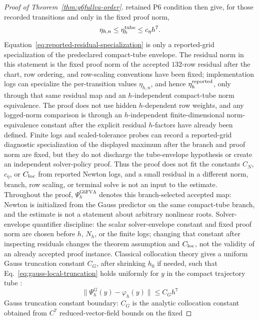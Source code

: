 \documentclass[preprint,12pt]{elsarticle}
\begin{document}
\begin{proof}[Proof of Theorem~\ref{thm:g6fullva-order}]
retained P6 condition then give, for those recorded transitions and only in
the fixed proof norm,
\begin{equation}
\label{eq:reported-residual-specialization}
  \eta_{h,n}\le \eta_h^{\rm tube}\le c_\eta h^7 .
\end{equation}
Equation~\eqref{eq:reported-residual-specialization} is only a reported-grid
specialization of the predeclared compact-tube envelope.
The residual norm in this statement is the fixed proof norm of the accepted
\(132\)-row residual after the chart, row ordering, and row-scaling
conventions have been fixed; implementation logs can specialize the
per-transition values \(\eta_{h,n}\), and hence
\(\eta_h^{\rm reported}\), only through that same residual map and an
\(h\)-independent compact-tube norm equivalence. The proof does not use
hidden \(h\)-dependent row weights, and
any logged-norm comparison is through an \(h\)-independent
finite-dimensional norm-equivalence constant after the explicit residual
\(h\)-factors have already been defined. Finite logs and scaled-tolerance
probes can record a reported-grid diagnostic specialization of the displayed
maximum after the branch and proof norm are fixed, but they do not discharge
the tube-envelope hypothesis or create an independent solver-policy proof. Thus
the proof does not fit the constants \(C_N\), \(c_\eta\), or \(C_{\rm loc}\)
from reported Newton logs, and a small residual in a different norm, branch,
row scaling, or terminal solve is not an input to the estimate. Throughout
the proof, \(\Psi_h^{\mathrm{G6FVA}}\) denotes this branch-selected accepted map:
Newton is initialized from the Gauss predictor on the same compact-tube
branch, and the estimate is not a statement about arbitrary nonlinear roots.
Solver-envelope quantifier discipline: the scalar solver-envelope constant and fixed
proof norm are chosen before \(h\), \(N_h\), or the finite logs; changing that
constant after inspecting residuals changes the theorem assumption and
\(C_{\rm loc}\), not the validity of an already accepted proof instance.
Classical collocation theory gives a
uniform Gauss truncation constant \(C_G\), after shrinking \(h_0\) if needed,
such that Eq.~\eqref{eq:gauss-local-truncation} holds uniformly for \(y\) in
the compact trajectory tube \cite{hairer1993solving}:
\begin{equation}
\label{eq:gauss-local-truncation}
  \|\Psi_h^G(y)-\varphi_h(y)\|\le C_Gh^7
\end{equation}
Gauss truncation constant boundary: \(C_G\) is the analytic collocation
constant obtained from \(C^7\) reduced-vector-field bounds on the fixed

\end{proof}
\end{document}
